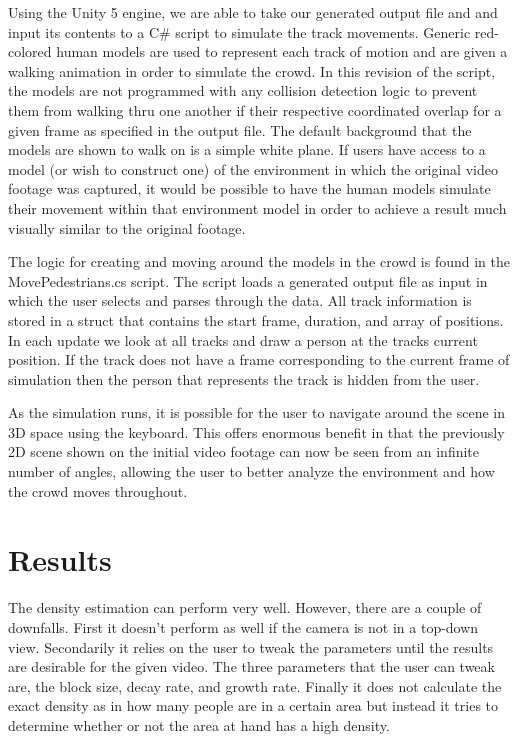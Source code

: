 \documentclass[12pt, onecolumn, conference]{IEEEtran}
\begin{document}
Using the Unity 5 engine, we are able to take our generated output file and and input its contents to a C\# script to simulate the track movements. Generic red-colored human models are used to represent each track of motion and are given a walking animation in order to simulate the crowd. In this revision of the script, the models are not programmed with any collision detection  logic to prevent them from walking thru one another if their respective coordinated overlap for a given frame as specified in the output file. The default background that the models are shown to walk on is a simple white plane. If users have access to a model (or wish to construct one) of the environment in which the original video footage was captured, it would be possible to have the human models simulate their movement within that environment model in order to achieve a result much visually similar to the original footage.

The logic for creating and moving around the models in the crowd is found in the MovePedestrians.cs script. The script loads a generated output file as input in which the user selects and parses through the data. All track information is stored in a struct that contains the start frame, duration, and array of positions. In each update we look at all tracks and draw a person at the tracks current position. If the track does not have a frame corresponding to the current frame of simulation then the person that represents the track is hidden from the user. 

As the simulation runs, it is possible for the user to navigate around the scene in 3D space using the keyboard. This offers enormous benefit in that the previously 2D scene shown on the initial video footage can now be seen from an infinite number of angles, allowing the user to better analyze the environment and how the crowd moves throughout. 

\section{Results}

The density estimation can perform very well. However, there are a couple of downfalls. First it doesn’t perform as well if the camera is not in a top-down view. Secondarily it relies on the user to tweak the parameters until the results are desirable for the given video. The three parameters that the user can tweak are, the block size, decay rate, and growth rate. Finally it does not calculate the exact density as in how many people are in a certain area but instead it tries to determine whether or not the area at hand has a high density.
\end{document}
